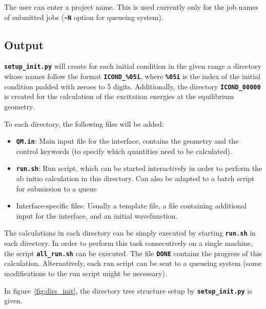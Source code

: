 \documentclass[a4paper,11pt,DIV=15,openany,twoside=false]{scrbook}
\newcommand{\ttt}[1]{\textbf{\texttt{#1}}}
\begin{document}
The user can enter a project name. This is used currently only for the job names of submitted jobs (\ttt{-N} option for queueing system).

\subsection{Output}

\ttt{setup\_init.py} will create for each initial condition in the given range a directory whose names follow the format \ttt{ICOND\_\%05i}, where \ttt{\%05i} is the index of the initial condition padded with zeroes to 5 digits. Additionally, the directory \ttt{ICOND\_00000} is created for the calculation of the excitation energies at the equilibrium geometry.

To each directory, the following files will be added:
\begin{itemize}
  \item \ttt{QM.in}: Main input file for the interface, contains the geometry and the control keywords (to specify which quantities need to be calculated). 
  \item \ttt{run.sh}: Run script, which can be started interactively in order to perform the ab initio calculation in this directory. Can also be adapted to a batch script for submission to a queue 
  \item Interface-specific files: Usually a template file, a file containing additional input for the interface, and an initial wavefunction.
\end{itemize}

The calculations in each directory can be simply executed by starting \ttt{run.sh} in each directory. In order to perform this task consecutively on a single machine, the script \ttt{all\_run.sh} can be executed. The file \ttt{DONE} contains the progress of this calculation.
Alternatively, each run script can be sent to a queueing system (some modifications to the run script might be necessary).

In figure~\ref{fig:dirs_init}, the directory tree structure setup by \ttt{setup\_init.py} is given.
\end{document}

